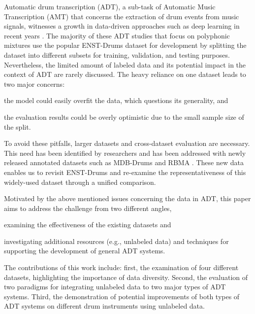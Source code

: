 \documentclass{article}
\begin{document}
Automatic drum transcription (ADT), a sub-task of Automatic Music Transcription (AMT) \cite{Benetos2013} that concerns the extraction of drum events from music signals, witnesses a growth in data-driven approaches such as deep learning in recent years \cite{Vogl2016, Southall2016, Vogl2017_icassp, Southall2017, Vogl2017_ismir}. The majority of these ADT studies that focus on polyphonic mixtures use the popular ENST-Drums dataset \cite{Gillet2006_enst} for development by splitting the dataset into different subsets for training, validation, and testing purposes. Nevertheless, the limited amount of labeled data and its potential impact in the context of ADT are rarely discussed. 
The heavy reliance on one dataset leads to two major concerns: 
\begin{inparaenum}[(i)]
	\item   the model could easily overfit the data, which questions its generality, and
    \item   the evaluation results could be overly optimistic due to the small sample size of the split. 
\end{inparaenum} 
To avoid these pitfalls, larger datasets and cross-dataset evaluation are necessary. This need has been identified by researchers and has been addressed with newly released annotated datasets such as MDB-Drums \cite{Southall2017_mdb} and RBMA \cite{Vogl2017_ismir}. These new data enables us to revisit ENST-Drums and re-examine the representativeness of this widely-used dataset through a unified comparison. 

Motivated by the above mentioned issues concerning the data in ADT, this paper aims to address the challenge from two different angles,
\begin{inparaenum}[(i)]
	\item examining the effectiveness of the existing datasets and
	\item investigating additional resources (e.g., unlabeled data) and techniques for supporting the development of general ADT systems.
\end{inparaenum} 
The contributions of this work include: first, the examination of four different datasets, highlighting the importance of data diversity. Second, the evaluation of two paradigms for integrating unlabeled data to two major types of ADT systems. Third, the demonstration of potential improvements of both types of ADT systems on different drum instruments using unlabeled data.
\end{document}
